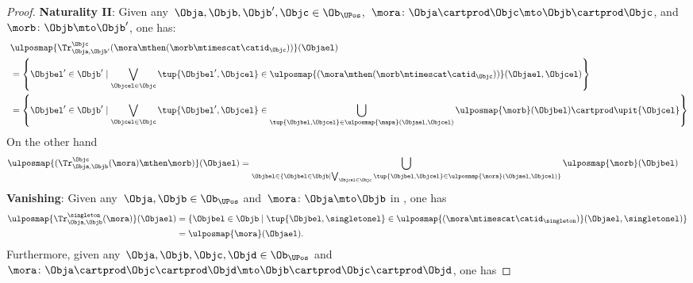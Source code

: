 \begin{proof}
    \textbf{Naturality II}:
    Given any~$\Obja,\Objb,\Objb',\Objc \in \Ob_{\UPos}$,~$\mora\colon \Obja\cartprod \Objc \mto \Objb\cartprod \Objc$, and~$\morb\colon \Objb\mto \Objb'$, one has:
    \begin{equation*}
        \begin{aligned}
            ~ & \ulposmap{\Tr_{\Obja,\Objb'}^{\Objc}(\mora \mthen (\morb \mtimescat \catid_\Objc))}(\Objael)                                                                                                                            \\
              & =
            \left \{\Objbel'\in \Objb' \mid \bigvee_{\Objcel\in \Objc} \tup{\Objbel',\Objcel}\in \ulposmap{(\mora \mthen (\morb \mtimescat \catid_\Objc))}(\Objael,\Objcel)\right\}                                                     \\
              & =\left\{ \Objbel'\in \Objb'\mid \bigvee_{\Objcel\in \Objc} \tup{\Objbel',\Objcel}\in \bigcup_{\tup{\Objbel,\Objcel}\in \ulposmap{\mapa}(\Objael,\Objcel)} \ulposmap{\morb}(\Objbel) \cartprod \upit\{ \Objcel\}\right\}
        \end{aligned}
    \end{equation*}
    On the other hand
    \begin{equation*}
        \begin{aligned}
            \ulposmap{(\Tr_{\Obja,\Objb}^{\Objc}(\mora)\mthen \morb)}(\Objael) & =
            \bigcup_{\Objbel \in \{ \Objbel \in \Objb \mid \bigvee_{\Objcel \in \Objc}\tup{\Objbel,\Objcel}\in \ulposmap{\mora}(\Objael,\Objcel)\}}\ulposmap{\morb}(\Objbel)
        \end{aligned}
    \end{equation*}
    \textbf{Vanishing}:
    Given any~$\Obja,\Objb\in \Ob_{\UPos}$ and~$\mora\colon \Obja \mto \Objb$ in \UPos, one has
    \begin{equation*}
        \begin{aligned}
            \ulposmap{\Tr_{\Obja,\Objb}^{\singleton}(\mora)}(\Objael) & =\{\Objbel \in \Objb \mid \tup{\Objbel,\singletonel}\in \ulposmap{(\mora\mtimescat \catid_{\singleton})}(\Objael,\singletonel)\} \\
                                                                      & =\ulposmap{\mora}(\Objael).
        \end{aligned}
    \end{equation*}
    Furthermore, given any~$\Obja,\Objb,\Objc,\Objd \in \Ob_{\UPos}$ and~$\mora\colon \Obja \cartprod \Objc \cartprod \Objd\mto \Objb \cartprod \Objc \cartprod \Objd$, one has

\end{proof}
